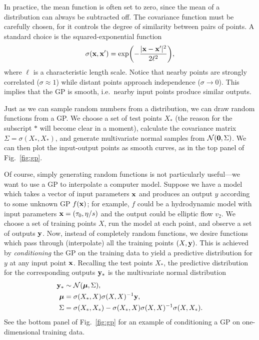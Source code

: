 \documentclass[aps,prc,reprint,superscriptaddress,amsmath]{revtex4-1}
\begin{document}
In practice, the mean function is often set to zero, since the mean of a distribution can always be subtracted off.
The covariance function must be carefully chosen, for it controls the degree of similarity between pairs of points.
A standard choice is the squared-exponential function
\begin{equation}
  \sigma(\mathbf x, \mathbf x') = \exp\biggl( -\frac{|\mathbf x - \mathbf x'|^2}{2\ell^2} \biggr),
\end{equation}
where $\ell$ is a characteristic length scale.
Notice that nearby points are strongly correlated ($\sigma \approx 1$) while distant points approach independence ($\sigma \rightarrow 0$).
This implies that the GP is smooth, i.e.\ nearby input points produce similar outputs.

Just as we can sample random numbers from a distribution, we can draw random functions from a GP.
We choose a set of test points $X_*$ (the reason for the subscript $*$ will become clear in a moment), calculate the covariance matrix $\Sigma = \sigma(X_*, X_*)$, and generate multivariate normal samples from $\mathcal N(\mathbf 0, \Sigma)$.
We can then plot the input-output points as smooth curves, as in the top panel of Fig.~\ref{fig:gp}.

Of course, simply generating random functions is not particularly useful---we want to use a GP to interpolate a computer model.
Suppose we have a model which takes a vector of input parameters $\mathbf x$ and produces an output $y$ according to some unknown GP $f(\mathbf x)$; for example, $f$ could be a hydrodynamic model with input parameters $\mathbf x = (\tau_0, \eta/s)$ and the output could be elliptic flow $v_2$.
We choose a set of training points $X$, run the model at each point, and observe a set of outputs $\mathbf y$.
Now, instead of completely random functions, we desire functions which pass through (interpolate) all the training points $(X, \mathbf y)$.
This is achieved by \emph{conditioning} the GP on the training data to yield a predictive distribution for $y$ at any input point $\mathbf x$.
Recalling the test points $X_*$, the predictive distribution for the corresponding outputs $\mathbf y_*$ is the multivariate normal distribution
\begin{equation}
  \begin{aligned}
    \mathbf y_* &\sim \mathcal N(\boldsymbol\mu, \Sigma), \\
    \boldsymbol\mu &= \sigma(X_*, X)\sigma(X, X)^{-1}\mathbf y, \\
    \Sigma &= \sigma(X_*,X_*) - \sigma(X_*,X)\sigma(X,X)^{-1}\sigma(X,X_*).
  \end{aligned}
  \label{eq:cond}
\end{equation}
See the bottom panel of Fig.~\ref{fig:gp} for an example of conditioning a GP on one-dimensional training data.
\end{document}
